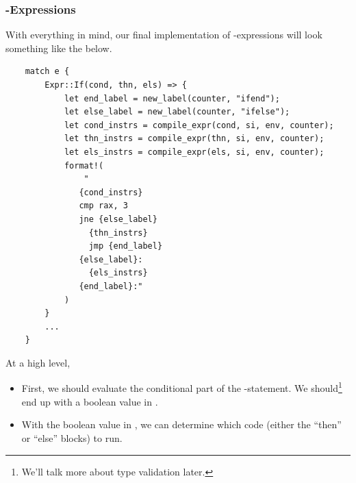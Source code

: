 \subsubsection{-Expressions}
With everything in mind, our final implementation of -expressions will look something like the below.
\begin{verbatim}
    match e {
        Expr::If(cond, thn, els) => {
            let end_label = new_label(counter, "ifend");
            let else_label = new_label(counter, "ifelse");
            let cond_instrs = compile_expr(cond, si, env, counter);
            let thn_instrs = compile_expr(thn, si, env, counter);
            let els_instrs = compile_expr(els, si, env, counter);
            format!(
                "
               {cond_instrs}
               cmp rax, 3
               jne {else_label}
                 {thn_instrs}
                 jmp {end_label}
               {else_label}:
                 {els_instrs}
               {end_label}:"
            )
        }
        ... 
    }\end{verbatim}
At a high level, 
\begin{itemize}
    \item First, we should evaluate the conditional part of the -statement. We should\footnote{We'll talk more about type validation later.} end up with a boolean value in . 
    \item With the boolean value in , we can determine which code (either the ``then'' or ``else'' blocks) to run. 
\end{itemize}
